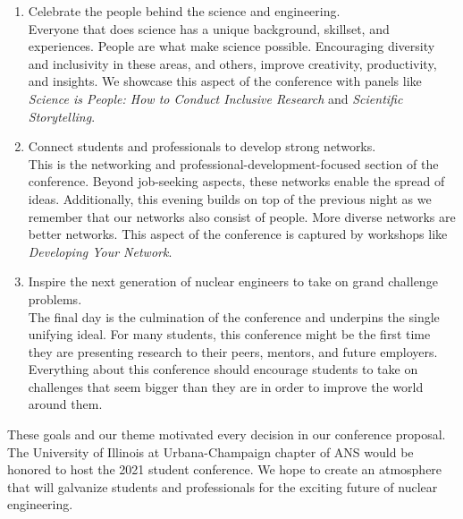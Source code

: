 \begin{enumerate}
	\item Celebrate the people behind the science and engineering.\\
	Everyone that does science has a unique background, skillset, and experiences. People are what make science possible. Encouraging diversity and inclusivity in these areas, and others, improve creativity, productivity, and insights. We showcase this aspect of the conference with panels like \textit{Science is People: How to Conduct Inclusive Research} and \textit{Scientific Storytelling}.
	\item Connect students and professionals to develop strong networks.\\
	This is the networking and professional-development-focused section of the conference. Beyond job-seeking aspects, these networks enable the spread of ideas. Additionally, this evening builds on top of the previous night as we remember that our networks also consist of people. More diverse networks are better networks. This aspect of the conference is captured by workshops like \textit{Developing Your Network}. 
	\item Inspire the next generation of nuclear engineers to take on grand challenge problems. \\
	The final day is the culmination of the conference and underpins the single unifying ideal. For many students, this conference might be the first time they are presenting research to their peers, mentors, and future employers. Everything about this conference should encourage students to take on challenges that seem bigger than they are in order to improve the world around them.  
\end{enumerate}
These goals and our theme motivated every decision in our conference proposal. The University of Illinois at Urbana-Champaign chapter of ANS would be honored to host the 2021 student conference. We hope to create an atmosphere that will galvanize students and professionals for the exciting future of nuclear engineering.\\
